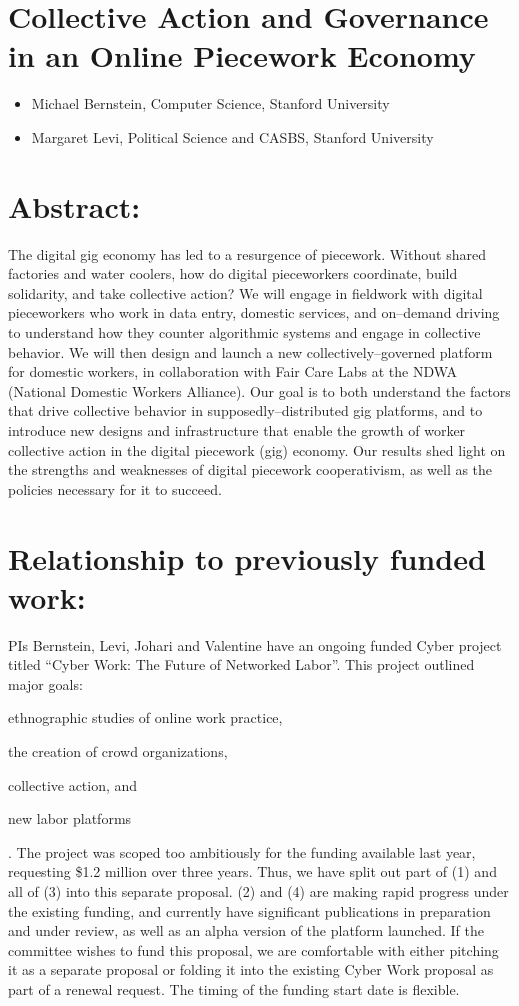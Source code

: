 \documentclass[11pt]{article}
\begin{document}
\section*{Collective Action and Governance in an Online Piecework Economy}

\begin{itemize}[leftmargin=0em,label={}]
  \item Michael Bernstein, Computer Science, Stanford University
  \item Margaret Levi, Political Science and CASBS, Stanford University
\end{itemize}

\section*{Abstract:} 
The digital gig economy has led to a resurgence of piecework.
Without shared factories and water coolers,
how do digital pieceworkers coordinate,
build solidarity,
and take collective action?
We will engage in fieldwork with digital pieceworkers who work in data entry,
domestic services,
and on--demand driving to understand how they counter algorithmic systems and engage in collective behavior.
We will then design and launch a new collectively--governed platform for domestic workers,
in collaboration with Fair Care Labs at the NDWA
(National Domestic Workers Alliance).
Our goal is to both understand the factors that drive collective behavior in supposedly--distributed gig platforms,
and to introduce new designs and infrastructure that enable the growth of worker collective action in the digital piecework
(gig)
economy.
Our results shed light on the strengths and weaknesses of  digital piecework cooperativism,
as well as the policies necessary for it to succeed.

\section*{Relationship to previously funded work:}
PIs Bernstein,
Levi,
Johari and Valentine have an ongoing funded Cyber project titled ``Cyber Work: The Future of Networked Labor''.
This project outlined major goals:
\begin{inlinelist}
\item ethnographic studies of online work practice,
\item the creation of crowd organizations,
\item collective action,
and
\item new labor platforms
\end{inlinelist}.
The project was scoped too ambitiously for the funding available last year,
requesting \$1.2 million over three years.
Thus, we have split out part of
(1) and all of
(3) into this separate proposal.
(2) and (4) are making rapid progress under the existing funding,
and currently have significant publications in preparation and under review,
as well as an alpha version of the platform launched.
If the committee wishes to fund this proposal,
we are comfortable with either pitching it as a separate proposal or folding it into the existing Cyber Work proposal as part of a renewal request.
The timing of the funding start date is flexible.
\end{document}
